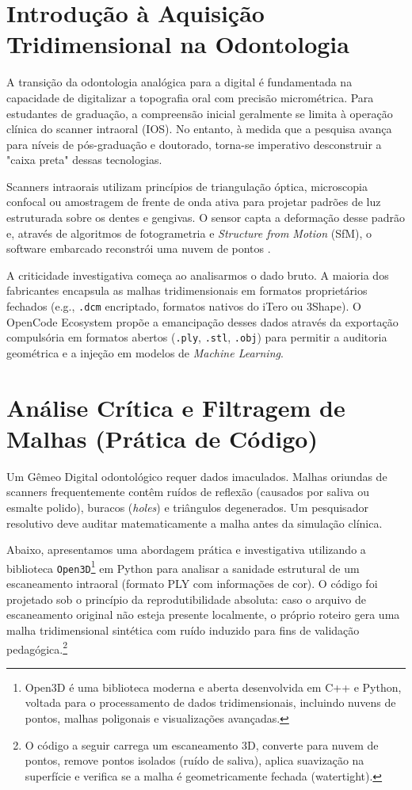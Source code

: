 \section{Introdução à Aquisição Tridimensional na Odontologia}

A transição da odontologia analógica para a digital é fundamentada na capacidade de digitalizar a topografia oral com precisão micrométrica. Para estudantes de graduação, a compreensão inicial geralmente se limita à operação clínica do scanner intraoral (IOS). No entanto, à medida que a pesquisa avança para níveis de pós-graduação e doutorado, torna-se imperativo desconstruir a "caixa preta" dessas tecnologias.

Scanners intraorais utilizam princípios de triangulação óptica, microscopia confocal ou amostragem de frente de onda ativa para projetar padrões de luz estruturada sobre os dentes e gengivas. O sensor capta a deformação desse padrão e, através de algoritmos de fotogrametria e \textit{Structure from Motion} (SfM), o software embarcado reconstrói uma nuvem de pontos \cite{Nature2026}.

A criticidade investigativa começa ao analisarmos o dado bruto. A maioria dos fabricantes encapsula as malhas tridimensionais em formatos proprietários fechados (e.g., \texttt{.dcm} encriptado, formatos nativos do iTero ou 3Shape). O OpenCode Ecosystem propõe a emancipação desses dados através da exportação compulsória em formatos abertos (\texttt{.ply}, \texttt{.stl}, \texttt{.obj}) para permitir a auditoria geométrica e a injeção em modelos de \textit{Machine Learning}.

\section{Análise Crítica e Filtragem de Malhas (Prática de Código)}

Um Gêmeo Digital odontológico requer dados imaculados. Malhas oriundas de scanners frequentemente contêm ruídos de reflexão (causados por saliva ou esmalte polido), buracos (\textit{holes}) e triângulos degenerados. Um pesquisador resolutivo deve auditar matematicamente a malha antes da simulação clínica.

Abaixo, apresentamos uma abordagem prática e investigativa utilizando a biblioteca \texttt{Open3D}\footnote{Open3D é uma biblioteca moderna e aberta desenvolvida em C++ e Python, voltada para o processamento de dados tridimensionais, incluindo nuvens de pontos, malhas poligonais e visualizações avançadas.} em Python para analisar a sanidade estrutural de um escaneamento intraoral (formato PLY com informações de cor). O código foi projetado sob o princípio da reprodutibilidade absoluta: caso o arquivo de escaneamento original não esteja presente localmente, o próprio roteiro gera uma malha tridimensional sintética com ruído induzido para fins de validação pedagógica.\footnote{O código a seguir carrega um escaneamento 3D, converte para nuvem de pontos, remove pontos isolados (ruído de saliva), aplica suavização na superfície e verifica se a malha é geometricamente fechada (watertight).}

